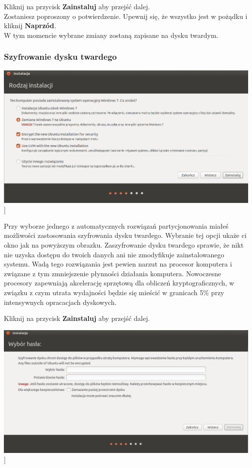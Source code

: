 \begin{flushright}
Kliknij na przycisk \textbf{Zainstaluj} aby przejść dalej.\\
Zostaniesz poproszony o potwierdzenie. Upewnij się, że wszystko jest w pożądku i kliknij \textbf{Naprzód}.\\
W tym momencie wybrane zmiany zostaną zapisane na dysku twardym.
\end{flushright}
\clearpage

\subsubsection{Szyfrowanie dysku twardego}
\begin{center}
	\includegraphics[scale=0.5]{images/instalator_partycjonowanie_szyfrowanie1.png}]
\end{center}
Przy wyborze jednego z automatycznych rozwiązań partycjonowania miałeś możliwości zastosowania szyfrowania dysku twardego. Wybranie tej opcji ukaże ci okno jak na powyższym obrazku. Zaszyfrowanie dysku twardego sprawie, że nikt nie uzyska dostępu do twoich danych ani nie zmodyfikuje zainstalowanego systemu. Wadą tego rozwiązania jest pewien narzut na procesor komputera i związane z tym zmniejszenie płynności działania komputera. Nowoczesne procesory zapewniają akcelerację sprzętową dla obliczeń kryptograficznych, w związku z czym utrata wydajności będzie się mieścić w granicach 5\% przy intensywnych opracacjach dyskowych.
\begin{flushright}
Kliknij na przycisk \textbf{Zainstaluj} aby przejść dalej.
\end{flushright}
\clearpage
\begin{center}
	\includegraphics[scale=0.5]{images/instalator_partycjonowanie_szyfrowanie2.png}]
\end{center}
